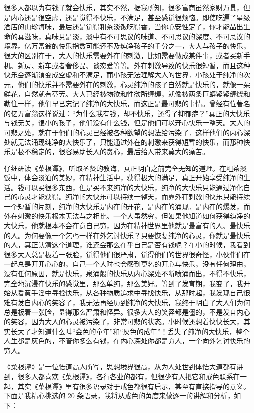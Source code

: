 很多人都以为有钱了就会快乐，其实不然，据我所知，很多富商虽然家财万贯，但是内心还是很空虚，还是觉得不快乐，不满足，甚至感觉很烦恼。即使吃遍了星级酒店的山珍海味，最后还是觉得粗茶淡饭吃得香。当你心安性定了，你才能品出生命的真滋味，真味只是淡，淡中有不可思议的味道、不可思议的深度、不可思议的境界。亿万富翁的快乐指数可能还不及纯净孩子的千分之一，大人与孩子的快乐，很大的区别在于，大人的快乐需要外在的刺激，比如需要做成某件事，或者买新手机、新房、新车或者奢侈品、谈恋爱等等。外在刺激导致的快乐很短暂，而且这种快乐会逐渐演变成空虚和不满足，而小孩无法理解大人的世界，小孩处于纯净的次元，他们的快乐并不需要外在的刺激，心灵纯净的孩子自然就是快乐的，就像一朵鲜花，自然就有芬芳。大人已经被物欲和性欲所缠缚，就像被两条巨蟒紧紧缠绕和勒住一样，他们早已忘记了纯净的大快乐，而这正是最可悲的事情。曾经有位著名的亿万富翁这样说过：“为什么我有钱，却不快乐，还得了抑郁症？”真正的大快乐与钱无关，很小的孩子，他们没有什么钱，但是他们可以开心快乐一整天。大人的可悲之处，就在于他们的心灵已经被各种欲望的想法给污染了，这样他们的内心深处就无法涌现纯净的大快乐了，只能通过外在的刺激来获得短暂的快乐，而那种快乐是极不稳定的，很容易助长人的贪心，最后给人带来莫大的痛苦。

仔细研读《菜根谭》，听取圣贤的教诲，真正明白之前完全无知的道理。在粗茶淡饭中，体会淡泊的美妙，在精神生活中，获得极大的满足，真正开始享受纯净的生活。钱可以买很多东西，但是买不来纯净的大快乐，纯净的大快乐只能通过净化自己的心灵才能获得。纯净的大快乐可以持续一整天，而靠外在刺激的快乐只能持续一个短暂的片刻，纯净的大快乐是内在的开花，是内在的涌现，是内在的爆发，而外在刺激的快乐根本无法与之相比。一个人虽然穷，但如果他知道如何获得纯净的大快乐，他就根本不会在意自己穷，因为在精神世界里他就是最富有的人、最快乐的人。为何要像一个乞丐一样在外乞讨快乐？只要恢复纯净的心灵，你就是最快乐的人，真正认清这个道理，谁还会那么在乎自己是否有钱呢？在小的时候，我看到很多大人总是板着一张脸，觉得他们很严肃，觉得他们的世界很奇怪，小伙伴们在一起总是开开心心的，自己一个人时也会感到莫名的开心与快乐，没有任何理由，没有任何原因，就是快乐，泉涌般的快乐从内心深处不断喷涌而出，不得不快乐，完全地沉浸在快乐的感觉里，那么单纯，那么美好。等到了发育期，我变了，我开始从看黄手淫中寻找快乐，从各种物质追求中寻找快乐，从那时起，我发现自己很难有发自内心的笑容了，我无法再经历到纯净的大快乐，我终于明白了大人们为何总是板着一张脸，显得那么严肃和怪异。很多大人的笑容都是僵的，不是发自内心的笑容，因为大人的心灵被污染了，非常可悲的状态。小时候还想着快快长大，其实长大了才知道什么叫“金色的童年”和“灰色的成年”！丢失了纯净的大快乐，整个人生都是灰色的，不管你多么有钱，在内心深处你都是穷人，一个向外乞讨快乐的穷人。

《菜根谭》是一位悟道高人所写，思想境界很高，从为人处世到体悟大道都有讲到，很多人都喜欢《菜根谭》，各行各业的都有，但很少有人把它和戒色联系在一起，其实《菜根谭》里有很多语录对于戒色都很有启示，甚至有直接指导的意义。下面是我精心挑选的 20 条语录，我将从戒色的角度来做逐一的讲解和分析，如下：

